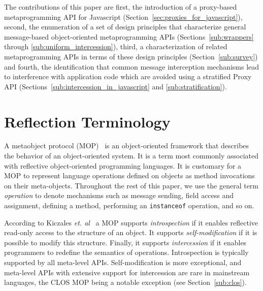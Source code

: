 \documentclass{sig-alternate}
\begin{document}
The contributions of this paper are first, the introduction of a proxy-based metaprogramming API for Javascript (Section~\ref{sec:proxies_for_javascript}), second, the enumeration of a set of design principles that characterize general message-based object-oriented metaprogramming APIs (Sections~\ref{sub:wrappers} through \ref{sub:uniform_intercession}), third, a characterization of related metaprogramming APIs in terms of these design principles (Section~\ref{sub:survey}) and fourth, the identification that common message interception mechanisms lead to interference with application code which are avoided using a stratified Proxy API (Sections~\ref{sub:intercession_in_javascript} and \ref{sub:stratification}).

\section{Reflection Terminology}
\label{sec:reflection}



A metaobject protocol (MOP)~\cite{kiczales91art} is an object-oriented framework that describes the behavior of an object-oriented system. It is a term most commonly associated with reflective object-oriented programming languages. It is customary for a MOP to represent language operations defined on objects as method invocations on their meta-objects. Throughout the rest of this paper, we use the general term \emph{operation} to denote mechanisms such as message sending, field access and assignment, defining a method, performing an \texttt{instanceof} operation, and so on.

According to Kiczales \emph{et. al}~\cite{kiczales91art} a MOP supports \emph{introspection} if it enables reflective read-only access to the structure of an object. It supports \emph{self-modification} if it is possible to modify this structure.
Finally, it supports \emph{intercession} if it enables programmers to redefine the semantics of operations.
Introspection is typically supported by all meta-level APIs. Self-modification is more exceptional, and
meta-level APIs with extensive support for intercession are rare in mainstream languages, the CLOS MOP being a notable exception (see Section~\ref{sub:clos}).
\end{document}
